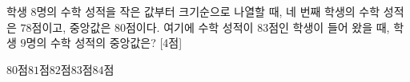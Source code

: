 학생 $8$명의 수학 성적을 작은 값부터 크기순으로 나열할 때, 네 번째 학생의 수학 성적은 $78$점이고, 중앙값은 $80$점이다. 여기에 수학 성적이 $83$점인 학생이 들어 왔을 때, 학생 $9$명의 수학 성적의 중앙값은? \mbox{[4점]}
\begin{choices32}{$80$점}{$81$점}{$82$점}{$83$점}{$84$점}\end{choices32}
